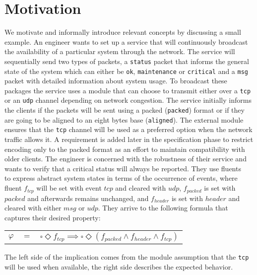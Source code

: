 \section{Motivation}\label{sec:motivation}
We motivate and informally introduce relevant concepts by discussing a small example.
An engineer wants to set up a service that will continuously broadcast the availability of a particular system through the network. The service will sequentially send two types of packets, a \texttt{status} packet that informs the general state of the system which can either be \texttt{ok}, \texttt{maintenance} or \texttt{critical} and a \texttt{msg} packet with detailed information about system usage. To broadcast these packages the service uses a module that can choose to transmit either over a \texttt{tcp} or an \texttt{udp} channel depending on network congestion. The service initially informs the clients if the packets will be sent using a packed (\texttt{packed}) format or if they are going to be aligned to an eight bytes base (\texttt{aligned}).  
The external module ensures that the \texttt{tcp} channel will be used as a preferred option when the network traffic allows it. A requirement is added later in the specification phase to restrict encoding only to the packed format as an effort to maintain compatibility with older clients. The engineer is concerned with the robustness of their service and wants to verify that a critical status will always be reported. They use fluents ~\cite{DBLP:conf/sigsoft/GiannakopoulouM03} to express abstract system states in terms of the occurrence of events, where fluent $f_{tcp}$ will be set with event $tcp$ and cleared with $udp$, $f_{packed}$ is set with $packed$ and afterwards remains unchanged, and $f_{header}$ is set with $header$ and cleared with either $msg$ or $udp$. They arrive to the following formula that captures their desired property:

\begin{center}
	\begin{tabular}{ r c l }
		$\varphi$& $=$ &$\square \Diamond f_{tcp}\implies\square \Diamond (f_{packed} \wedge f_{header} \wedge f_{tcp})$\\
	\end{tabular}
\end{center} 
The left side of the implication comes from the module assumption that the \texttt{tcp} will be used when available, the right side describes the expected behavior.

